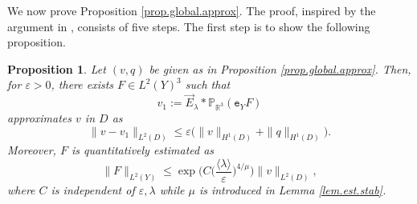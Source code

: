 \documentclass[11pt,a4paper]{article}
\numberwithin{equation}{section}
\newtheorem{proposition}[theorem]{Proposition}
{\theorembodyfont{\rmfamily}\newtheorem{remark}[theorem]{Remark}}
{\theorembodyfont{\rmfamily}\newtheorem{remarks}[theorem]{Remarks}}
\newcommand{\R}{\mathbb{R}}
\newcommand{\eps}{\varepsilon}
\begin{document}
We now prove Proposition \ref{prop.global.approx}. The proof, inspired by the argument in \cite[Proof of Theorem 2.4]{EncPer2021}, consists of five steps. The first step is to show the following proposition.


\begin{proposition}\label{prop.global.approx.step1}
Let $(v, q)$ be given as in Proposition \ref{prop.global.approx}. Then, for $\eps > 0$, there exists $F\in L^2(Y)^3$ such that 
\[
    v_1 
    := 
    \vec{E}_{\lambda} \ast {\mathbb P}_{\R^3} (\mathtt{e}_Y F) 
\]
approximates $v$ in $D$ as 
\[
    \|v - v_1\|_{L^2(D)}
    \le
    \eps 
    \Big( \|v\|_{H^{1}(D)} + \|q\|_{H^{1}(D)} \Big). 
\]
Moreover, $F$ is quantitatively estimated as 
\begin{equation}\label{est.F}
    \|F\|_{L^2(Y)}
    \le
    \exp
    \bigg(
    C
    \Big(\frac{\langle \lambda \rangle}{\eps} \Big)^{4/\mu}
    \bigg)
    \|v\|_{L^2(D)}, 
\end{equation}
where $C$ is independent of $\eps, \lambda$ while $\mu$ is introduced in Lemma \ref{lem.est.stab}. 
\end{proposition}
\end{document}
